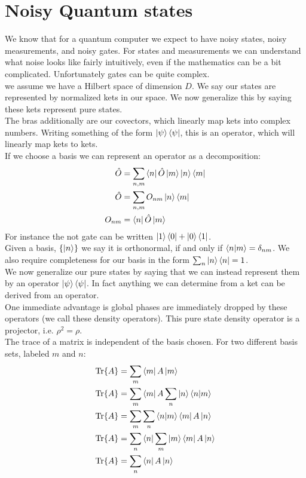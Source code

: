 \section{Noisy Quantum states}
We know that for a quantum computer we expect to have noisy states, noisy measurements, and noisy gates. For states and measurements we can understand what noise looks like fairly intuitively, even if the mathematics can be a bit complicated. Unfortunately gates can be quite complex. \\
we assume we have a Hilbert space of dimension $D$. We say our states are represented by normalized kets in our space. We now generalize this by saying these kets represent pure states. \\
The bras additionally are our covectors, which linearly map kets into complex numbers. Writing something of the form $\ket{\psi}\bra{\psi}$, this is an operator, which will linearly map kets to kets.\\
If we choose a basis we can represent an operator as a decomposition:
\begin{align*}
	\hat{O} &= \sum_{n,m} \bra{n}\hat{O}\ket{m} \ket{n}\bra{m} \\
	\hat{O} &= \sum_{n,m} O_{nm}\ket{n}\bra{m} \\
	O_{nm} &= \bra{n}\hat{O}\ket{m}
\end{align*}
For instance the not gate can be written $\ket{1}\bra{0} + \ket{0}\bra{1}$. \\
Given a basis, $\{\ket{n}\}$ we say it is orthonormal, if and only if $\bra{n}\ket{m} = \delta_{nm}$. We also require completeness for our basis in the form $\sum_n \ket{n}\bra{n} = 1$.\\
We now generalize our pure states by saying that we can instead represent them by an operator $\ket{\psi}\bra{\psi}$. In fact anything we can determine from a ket can be derived from an operator.\\
One immediate advantage is global phases are immediately dropped by these operators (we call these density operators). This pure state density operator is a projector, i.e. $\rho^2 = \rho$. \\
The trace of a matrix is independent of the basis chosen. For two different basis sets, labeled $m$ and $n$:
\begin{align*}
	\Tr{A} &= \sum_m \bra{m}A\ket{m} \\
	\Tr{A} &= \sum_m \bra{m}A\sum_n \ket{n}\bra{n}\ket{m} \\
	\Tr{A} &= \sum_m\sum_n \bra{n}\ket{m}\bra{m}A \ket{n} \\
	\Tr{A} &= \sum_n \bra{n}\sum_m\ket{m}\bra{m}A \ket{n} \\
	\Tr{A} &= \sum_n \bra{n}A \ket{n}
\end{align*}
